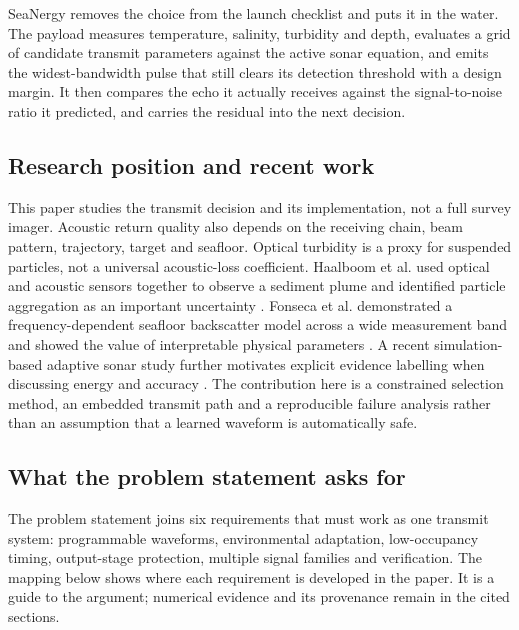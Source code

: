 \documentclass[conference,a4paper]{IEEEtran}
\begin{document}
SeaNergy removes the choice from the launch checklist and puts it in the water.
The payload measures temperature, salinity, turbidity and depth, evaluates a
grid of candidate transmit parameters against the active sonar equation, and
emits the widest-bandwidth pulse that still clears its detection threshold with
a design margin. It then compares the echo it actually receives against the
signal-to-noise ratio it predicted, and carries the residual into the next
decision.


\subsection{Research position and recent work}
This paper studies the transmit decision and its implementation, not a full survey imager. Acoustic return quality also depends on the receiving chain, beam pattern, trajectory, target and seafloor. Optical turbidity is a proxy for suspended particles, not a universal acoustic-loss coefficient. Haalboom et al. used optical and acoustic sensors together to observe a sediment plume and identified particle aggregation as an important uncertainty \cite{haalboom2022}. Fonseca et al. demonstrated a frequency-dependent seafloor backscatter model across a wide measurement band and showed the value of interpretable physical parameters \cite{fonseca2025}. A recent simulation-based adaptive sonar study further motivates explicit evidence labelling when discussing energy and accuracy \cite{reddy2026}. The contribution here is a constrained selection method, an embedded transmit path and a reproducible failure analysis rather than an assumption that a learned waveform is automatically safe.

\subsection{What the problem statement asks for}

The problem statement joins six requirements that must work as one transmit
system: programmable waveforms, environmental adaptation, low-occupancy timing,
output-stage protection, multiple signal families and verification. The mapping
below shows where each requirement is developed in the paper. It is a guide to
the argument; numerical evidence and its provenance remain in the cited sections.
\end{document}
